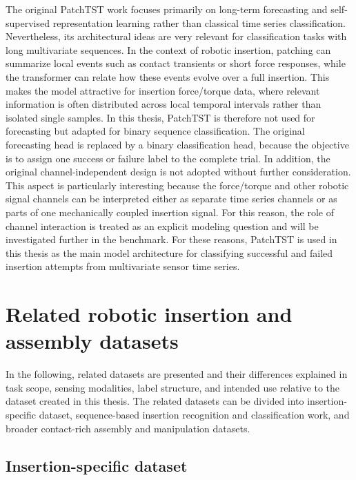 The original PatchTST work focuses primarily on long-term forecasting and self-supervised representation learning rather than classical time series classification. Nevertheless, its architectural ideas are very relevant for classification tasks with long multivariate sequences. In the context of robotic insertion, patching can summarize local events such as contact transients or short force responses, while the transformer can relate how these events evolve over a full insertion. This makes the model attractive for insertion force/torque data, where relevant information is often distributed across local temporal intervals rather than isolated single samples. In this thesis, PatchTST is therefore not used for forecasting but adapted for binary sequence classification. The original forecasting head is replaced by a binary classification head, because the objective is to assign one success or failure label to the complete trial. In addition, the original channel-independent design is not adopted without further consideration. This aspect is particularly interesting because the force/torque and other robotic signal channels can be interpreted either as separate time series channels or as parts of one mechanically coupled insertion signal. For this reason, the role of channel interaction is treated as an explicit modeling question and will be investigated further in the benchmark. For these reasons, PatchTST is used in this thesis as the main model architecture for classifying successful and failed insertion attempts from multivariate sensor time series.

\section{Related robotic insertion and assembly datasets} \label{sec:related_datasets}

In the following, related datasets are presented and their differences explained in task scope, sensing modalities, label structure, and intended use relative to the dataset created in this thesis. The related datasets can be divided into insertion-specific dataset, sequence-based insertion recognition and classification work, and broader contact-rich assembly and manipulation datasets.

\subsection{Insertion-specific dataset}

